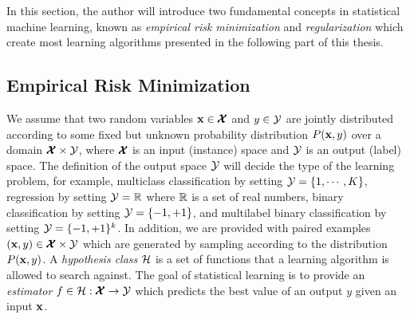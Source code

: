 In this section, the author will introduce two fundamental concepts in statistical machine learning, known as \textit{empirical risk minimization} \citep{Vapnik92principles} and \textit{regularization} \citep{Evgeniou99a} which create most learning algorithms presented in the following part of this thesis.

\subsection{Empirical Risk Minimization}\label{sc_erm}

We assume that two random variables $\mathbf {x}\in\pmb {\mathcal{X}}$ and $y\in\mathcal{Y}$ are jointly distributed according to some fixed but unknown probability distribution $P(\mathbf {x},y)$ over a domain $\pmb {\mathcal{X}}\times\mathcal{Y}$, where $\pmb {\mathcal{X}}$ is an input (instance) space and $\mathcal{Y}$ is an output (label) space.
The definition of the output space $\mathcal{Y}$ will decide the type of the learning problem,
for example, 
multiclass classification by setting $\mathcal{Y}=\{1,\cdots,K\}$,
regression by setting $\mathcal{Y}=\mathbb{R}$ where $\mathbb{R}$ is a set of real numbers,
binary classification by setting $\mathcal{Y}=\{-1,+1\}$, 
and multilabel binary classification by setting $\mathcal{Y} = \{-1,+1\}^k$.
In addition, we are provided with paired examples $(\mathbf {x},y)\in\pmb {\mathcal{X}}\times\mathcal{Y}$ which are generated by sampling according to the distribution $P(\mathbf {x},y)$.
A \textit{hypothesis class} $\mathcal{H}$ is a set of functions that a learning algorithm is allowed to search against.
The goal of statistical learning is to provide an \textit{estimator} $f\in\mathcal{H}:\pmb {\mathcal{X}}\rightarrow\mathcal{Y}$ which predicts the best value of an output $y$ given an input $\mathbf {x}$.

